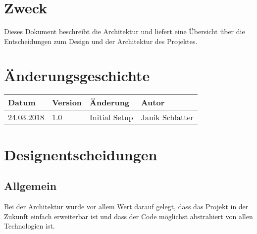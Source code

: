 \documentclass[
	ngerman,
	toc=listof, %
	toc=bibliography, %
	footnotes=multiple, %
	parskip=half, %
	numbers=noendperiod %
]{scrartcl}
\newcommand{\vorlagenOrdner}{../../99_Vorlagen} %
\begin{document}
\thispagestyle{plain}

\cleardoublepage


\section*{Zweck}
Dieses Dokument beschreibt die Architektur und liefert eine Übersicht über die Entscheidungen zum Design und der Architektur des Projektes.

\section*{Änderungsgeschichte}
\begin{tabularx}{\textwidth}{llXl}
	\toprule
	Datum & Version & Änderung & Autor \\
	\midrule
	24.03.2018 & 1.0 & Initial Setup & Janik Schlatter \\
	\bottomrule
\end{tabularx}
\cleardoublepage

{}
\tableofcontents
\cleardoublepage

\let\stdsection\section
\renewcommand\section{\clearpage\stdsection}

\section{Designentscheidungen}
	\subsection{Allgemein}
		Bei der Architektur wurde vor allem Wert darauf gelegt, dass das Projekt in der Zukunft einfach erweiterbar ist und dass der Code möglichst abstrahiert von allen Technologien ist.
\end{document}

